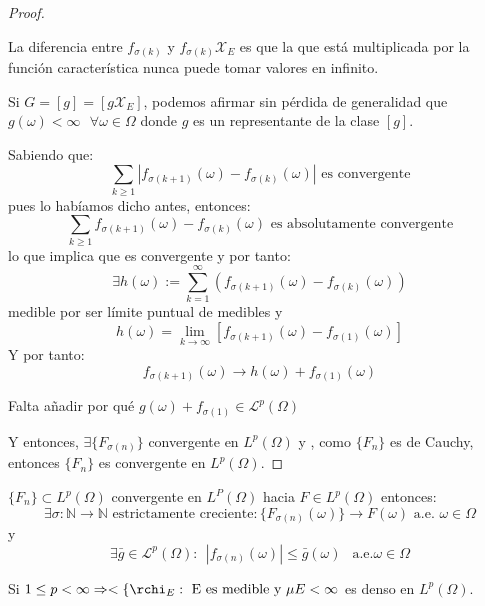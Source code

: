 \begin{proof}
  \begin{nota}
    La diferencia entre  $f_{\sigma(k)}$ y $f_{\sigma(k)}\mathcal X _E$ es que la que está multiplicada por la función característica nunca puede tomar valores en infinito.
  \end{nota}

  Si $G = [g] = [g \mathcal X _E]$, podemos afirmar sin pérdida de generalidad que $g(\omega) < \infty \ \ \ \forall \omega \in \Omega$ donde $g$ es un representante de la clase $[g]$.

  Sabiendo que:
  \[
    \sum_{k \geq 1} |f_{\sigma(k+1)}(\omega) - f_{\sigma(k)}(\omega)| \text{ es convergente}
  \]
  pues lo habíamos dicho antes, entonces:
  \[
    \sum_{k \geq 1} f_{\sigma(k+1)}(\omega) - f_{\sigma(k)}(\omega) \text{ es absolutamente convergente}
  \]
  lo que implica que es convergente y por tanto:
  \[
    \exists h(\omega):= \sum_{k=1}^\infty (f_{\sigma(k+1)}(\omega) - f_{\sigma(k)}(\omega))
  \]
  medible por ser límite puntual de medibles y
  \[
    h(\omega) = \lim_{k \to \infty}[f_{\sigma(k+1)}(\omega) -f_{\sigma(1)}(\omega)]
  \]
  Y por tanto:
  \[
    f_{\sigma(k+1)}(\omega) \to h(\omega) + f_{\sigma(1)}(\omega)
  \]

  Falta añadir por qué $g(\omega) + f_{\sigma(1)} \in \mathcal L ^p (\Omega)$




  Y entonces, $\exists \{ F_{\sigma(n)}\}$ convergente en $L^p(\Omega)$ y , como $\{F_n\}$ es de Cauchy, entonces $\{F_n\}$ es convergente en $L^p(\Omega)$.
\end{proof}


\begin{ncor} \label{jose}
  $\{F_n\} \subset  L ^p (\Omega)$ convergente en $L^P(\Omega)$ hacia $F \in L^p(\Omega)$ entonces:
  \[
    \exists \sigma : \mathbb N \to \mathbb N \text{ estrictamente creciente} : \{F_{\sigma(n)}(\omega)\}\to F(\omega) \text{ a.e. } \omega \in \Omega
  \]
  y
  \[
    \exists \bar g \in \mathcal L ^p (\Omega) : \ \ |f_{\sigma(n)}(\omega)| \leq \bar g (\omega) \ \ \text{ a.e.} \omega \in \Omega
  \]
\end{ncor}

\begin{ncor}
  Si $1 \leq p < \infty \Rightarrow < \{\rchi_{E} : \text{ E es medible y } \mu{E} < \infty$ es denso en $L^{p}(\Omega)$.
\end{ncor}

